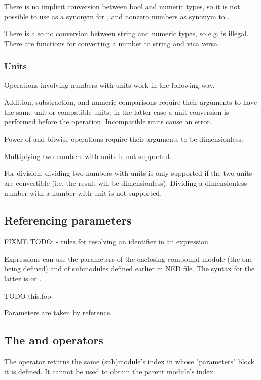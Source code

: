 There is no implicit conversion between bool and numeric types, so it is
not possible to use  as a synonym for , and nonzero numbers
as synonym to .

There is also no conversion between string and numeric types, so e.g. 
is illegal. There are functions for converting a number to string and vica versa.

\subsubsection{Units}

Operations involving numbers with units work in the following way.

Addition, substraction, and numeric comparisons require their arguments to
have the same unit or compatible units; in the latter case a unit conversion
is performed before the operation. Incompatible units cause an error.

Power-of and bitwise operations require their arguments to be dimensionless.

Multiplying two numbers with units is not supported.

For division, dividing two numbers with units is only supported if the two
units are convertible (i.e. the result will be dimensionless). Dividing
a dimensionless number with a number with unit is not supported.


\subsection{Referencing parameters}

FIXME TODO:
- rules for resolving an identifier in an expression

Expressions can use the parameters of the enclosing compound module
(the one being defined) and of submodules defined earlier in NED file.
The syntax for the latter is  or .

TODO this.foo

Parameters are taken by reference.




\subsection{The  and  operators}

The  operator returns the same (sub)module's index
in whose "parameters" block it is defined. It cannot be used to obtain
the parent module's index.

